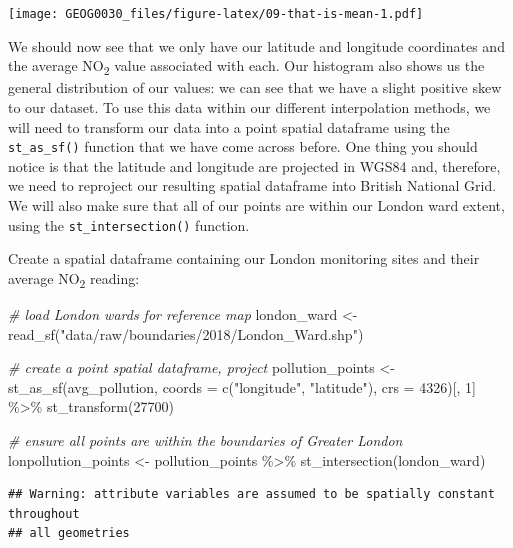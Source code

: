 \documentclass[
]{book}
\newenvironment{Shaded}{\begin{snugshade}}{\end{snugshade}}
\newcommand{\AttributeTok}[1]{\textcolor[rgb]{0.77,0.63,0.00}{#1}}
\newcommand{\CommentTok}[1]{\textcolor[rgb]{0.56,0.35,0.01}{\textit{#1}}}
\newcommand{\DecValTok}[1]{\textcolor[rgb]{0.00,0.00,0.81}{#1}}
\newcommand{\FunctionTok}[1]{\textcolor[rgb]{0.00,0.00,0.00}{#1}}
\newcommand{\NormalTok}[1]{#1}
\newcommand{\OtherTok}[1]{\textcolor[rgb]{0.56,0.35,0.01}{#1}}
\newcommand{\SpecialCharTok}[1]{\textcolor[rgb]{0.00,0.00,0.00}{#1}}
\newcommand{\StringTok}[1]{\textcolor[rgb]{0.31,0.60,0.02}{#1}}
\begin{document}
\texttt{[image: GEOG0030\_files/figure-latex/09-that-is-mean-1.pdf]}

We should now see that we only have our latitude and longitude coordinates and the average NO\textsubscript{2} value associated with each. Our histogram also shows us the general distribution of our values: we can see that we have a slight positive skew to our dataset. To use this data within our different interpolation methods, we will need to transform our data into a point spatial dataframe using the \texttt{st\_as\_sf()} function that we have come across before. One thing you should notice is that the latitude and longitude are projected in WGS84 and, therefore, we need to reproject our resulting spatial dataframe into British National Grid. We will also make sure that all of our points are within our London ward extent, using the \texttt{st\_intersection()} function.

Create a spatial dataframe containing our London monitoring sites and their average NO\textsubscript{2} reading:

\begin{Shaded}
\begin{Highlighting}[]
\CommentTok{\# load London wards for reference map}
\NormalTok{london\_ward }\OtherTok{\textless{}{-}} \FunctionTok{read\_sf}\NormalTok{(}\StringTok{"data/raw/boundaries/2018/London\_Ward.shp"}\NormalTok{)}

\CommentTok{\# create a point spatial dataframe, project}
\NormalTok{pollution\_points }\OtherTok{\textless{}{-}} \FunctionTok{st\_as\_sf}\NormalTok{(avg\_pollution, }\AttributeTok{coords =} \FunctionTok{c}\NormalTok{(}\StringTok{"longitude"}\NormalTok{, }\StringTok{"latitude"}\NormalTok{),}
    \AttributeTok{crs =} \DecValTok{4326}\NormalTok{)[, }\DecValTok{1}\NormalTok{] }\SpecialCharTok{\%\textgreater{}\%}
    \FunctionTok{st\_transform}\NormalTok{(}\DecValTok{27700}\NormalTok{)}

\CommentTok{\# ensure all points are within the boundaries of Greater London}
\NormalTok{lonpollution\_points }\OtherTok{\textless{}{-}}\NormalTok{ pollution\_points }\SpecialCharTok{\%\textgreater{}\%}
    \FunctionTok{st\_intersection}\NormalTok{(london\_ward)}
\end{Highlighting}
\end{Shaded}

\begin{verbatim}
## Warning: attribute variables are assumed to be spatially constant throughout
## all geometries
\end{verbatim}
\end{document}
